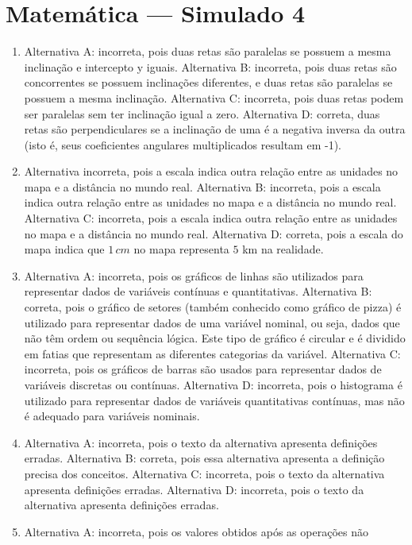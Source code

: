 \section*{Matemática — Simulado 4}

\begin{enumerate}
\item Alternativa A: incorreta, pois duas retas são paralelas se possuem a
mesma inclinação e intercepto y iguais.
Alternativa B: incorreta, pois duas retas são concorrentes se possuem
inclinações diferentes, e duas retas são paralelas se possuem a mesma
inclinação.
Alternativa C: incorreta, pois duas retas podem ser paralelas sem ter
inclinação igual a zero.
Alternativa D: correta, duas retas são perpendiculares se a inclinação
de uma é a negativa inversa da outra (isto é, seus coeficientes
angulares multiplicados resultam em -1).
\item Alternativa incorreta, pois a escala indica outra relação entre as
unidades no mapa e a distância no mundo real.
Alternativa B: incorreta, pois a escala indica outra relação entre as
unidades no mapa e a distância no mundo real.
Alternativa C: incorreta, pois a escala indica outra relação entre as
unidades no mapa e a distância no mundo real.
Alternativa D: correta, pois a escala do mapa indica que $1\,cm$ no mapa
representa $5$ km na realidade. 
\item Alternativa A: incorreta, pois os gráficos de linhas são utilizados para
representar dados de variáveis contínuas e quantitativas.
Alternativa B: correta, pois o gráfico de setores (também conhecido como
gráfico de pizza) é utilizado para representar dados de uma variável
nominal, ou seja, dados que não têm ordem ou sequência lógica. Este tipo
de gráfico é circular e é dividido em fatias que representam as
diferentes categorias da variável.
Alternativa C: incorreta, pois os gráficos de barras são usados para
representar dados de variáveis discretas ou contínuas.
Alternativa D: incorreta, pois o histograma é utilizado para representar
dados de variáveis quantitativas contínuas, mas não é adequado para
variáveis nominais.
\item Alternativa A: incorreta, pois o texto da alternativa apresenta
definições erradas.
Alternativa B: correta, pois essa alternativa apresenta a definição
precisa dos conceitos.
Alternativa C: incorreta, pois o texto da alternativa apresenta
definições erradas.
Alternativa D: incorreta, pois o texto da alternativa apresenta
definições erradas.
\item Alternativa A: incorreta, pois os valores obtidos após as operações não

\end{enumerate}
